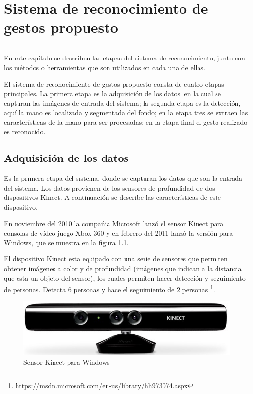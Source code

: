 \chapter{Sistema de reconocimiento de gestos propuesto}\label{capit:cap3}
\vspace{-2.0325ex}%
\noindent
\rule{\textwidth}{0.5pt}
\vspace{-5.5ex}%
\newcommand{\pushline}{\Indp}%

En este cap\'itulo se describen las etapas del sistema de reconocimiento, junto con los métodos o herramientas que son utilizados en cada una de ellas.   

El sistema de reconocimiento de gestos propuesto consta de cuatro etapas principales. La primera etapa es la adquisición de los datos, en la cual se capturan las imágenes de entrada del sistema; la segunda etapa es la detección, aquí la mano es localizada y segmentada del fondo; en la etapa tres se extraen las características de la mano para ser procesadas; en la etapa final el gesto realizado es reconocido.   
 
  
  
\section{Adquisición de los datos}\label{KinectSensor} 

Es la primera etapa del sistema, donde se capturan los datos que son la entrada del sistema. Los datos provienen de los sensores de profundidad de dos dispositivos Kinect. A continuación se describe las características de este dispositivo. 

En noviembre del 2010 la compa\'nia Microsoft lanz\'o el sensor Kinect para consolas de vídeo juego Xbox 360 y en febrero del 2011 lanz\'o la versi\'on para Windows, que se muestra en la figura \ref{fig:KinectPic}.  

El dispositivo Kinect esta equipado con una serie de sensores que permiten obtener imágenes a color y de profundidad (imágenes que indican a la distancia que esta un objeto del sensor), los cuales permiten hacer detección y seguimiento de personas. Detecta $6$ personas y hace el seguimiento de $2$ personas \footnote{https://msdn.microsoft.com/en-us/library/hh973074.aspx}.    
  
\begin{figure}[h!]
\begin{center}
\includegraphics[scale=.6]{./Figures/Kinect.jpg}
\end{center}
\caption{Sensor Kinect para Windows}
\label{fig:KinectPic}
\end{figure} 

